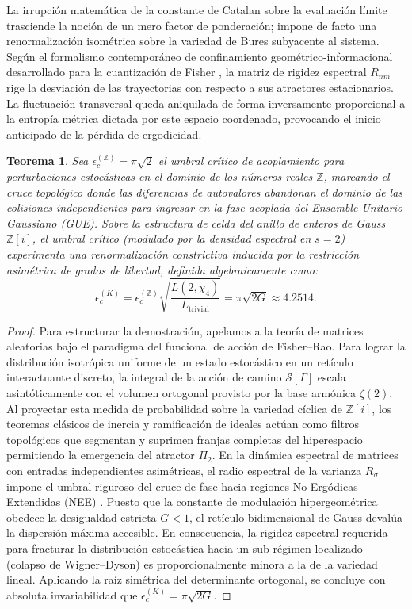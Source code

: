 \documentclass{article}
\numberwithin{equation}{section}
\theoremstyle{plain}
\newtheorem{teorema}{Teorema}[section]
\theoremstyle{definition}
\begin{document}
La irrupción matemática de la constante de Catalan sobre la evaluación límite trasciende la noción de un mero factor de ponderación; impone de facto una renormalización isométrica sobre la variedad de Bures subyacente al sistema. Según el formalismo contemporáneo de confinamiento geométrico-informacional desarrollado para la cuantización de Fisher \cite{BlumMerwin2026}, la matriz de rigidez espectral $R_{nm}$ rige la desviación de las trayectorias con respecto a sus atractores estacionarios. La fluctuación transversal queda aniquilada de forma inversamente proporcional a la entropía métrica dictada por este espacio coordenado, provocando el inicio anticipado de la pérdida de ergodicidad.

\begin{teorema}
\label{teo:acoplamiento_catalan_formal}
Sea $\epsilon_c^{(\mathbb{Z})} = \pi\sqrt{2}$ el umbral crítico de acoplamiento para perturbaciones estocásticas en el dominio de los números reales $\mathbb{Z}$, marcando el cruce topológico donde las diferencias de autovalores abandonan el dominio de las colisiones independientes para ingresar en la fase acoplada del Ensamble Unitario Gaussiano (GUE). Sobre la estructura de celda del anillo de enteros de Gauss $\mathbb{Z}[i]$, el umbral crítico (modulado por la densidad espectral en $s=2$) experimenta una renormalización constrictiva inducida por la restricción asimétrica de grados de libertad, definida algebraicamente como:
\begin{equation}
    \epsilon_c^{(K)} = \epsilon_c^{(\mathbb{Z})} \sqrt{\frac{L(2, \chi_4)}{L_{\text{trivial}}}} = \pi \sqrt{2G} \approx 4.2514.
\end{equation}
\end{teorema}

\begin{proof}
Para estructurar la demostración, apelamos a la teoría de matrices aleatorias bajo el paradigma del funcional de acción de Fisher--Rao. Para lograr la distribución isotrópica uniforme de un estado estocástico en un retículo interactuante discreto, la integral de la acción de camino $\mathcal{S}[\Gamma]$ escala asintóticamente con el volumen ortogonal provisto por la base armónica $\zeta(2)$. Al proyectar esta medida de probabilidad sobre la variedad cíclica de $\mathbb{Z}[i]$, los teoremas clásicos de inercia y ramificación de ideales actúan como filtros topológicos que segmentan y suprimen franjas completas del hiperespacio permitiendo la emergencia del atractor $\Pi_2$.
En la dinámica espectral de matrices con entradas independientes asimétricas, el radio espectral de la varianza $R_{\sigma}$ impone el umbral riguroso del cruce de fase hacia regiones No Ergódicas Extendidas (NEE) \cite{AltErdos2021}. Puesto que la constante de modulación hipergeométrica obedece la desigualdad estricta $G < 1$, el retículo bidimensional de Gauss devalúa la dispersión máxima accesible. En consecuencia, la rigidez espectral requerida para fracturar la distribución estocástica hacia un sub-régimen localizado (colapso de Wigner--Dyson) es proporcionalmente minora a la de la variedad lineal. Aplicando la raíz simétrica del determinante ortogonal, se concluye con absoluta invariabilidad que $\epsilon_c^{(K)} = \pi\sqrt{2G}$.
\end{proof}
\end{document}
